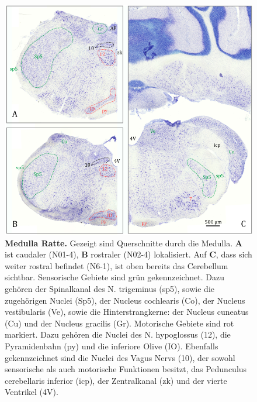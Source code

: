 \begin{figure}[H]
    \centering
    \includegraphics[width=\textwidth]{pictures/Bilder_Jule/Ratte/medulla.png}
    \caption[Medulla Ratte]{\textbf{Medulla Ratte.} Gezeigt sind Querschnitte durch die Medulla. \textbf{A} ist caudaler (N01-4), \textbf{B} rostraler (N02-4) lokalisiert. Auf \textbf{C}, dass sich weiter rostral befindet (N6-1), ist oben bereits das Cerebellum sichtbar. Sensorische Gebiete sind grün gekennzeichnet. Dazu gehören der Spinalkanal des N. trigeminus (sp5), sowie die zugehörigen Nuclei (Sp5), der Nucleus cochlearis (Co), der Nucleus vestibularis (Ve), sowie die Hinterstrangkerne: der Nucleus cuneatus (Cu) und der Nucleus gracilis (Gr). Motorische Gebiete sind rot markiert. Dazu gehören die Nuclei des N. hypoglossus (12), die Pyramidenbahn (py) und die inferiore Olive (IO). Ebenfalls gekennzeichnet sind die Nuclei des Vagus Nervs (10), der sowohl sensorische als auch motorische Funktionen besitzt, das Pedunculus cerebellaris inferior (icp), der Zentralkanal (zk) und der vierte Ventrikel (4V).} 
    \label{fig:medulla_ratte}
\end{figure}{}
